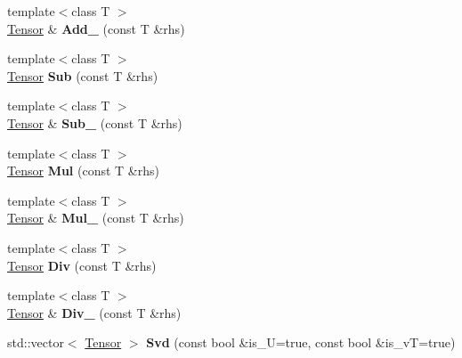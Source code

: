 \begin{DoxyCompactItemize}
{\footnotesize template$<$class T $>$ }\\\hyperlink{classcytnx_1_1Tensor}{Tensor} \& {\bfseries Add\+\_\+} (const T \&rhs)
\item 
\mbox{\label{classcytnx_1_1Tensor_a4648eef7874bad42d6d7b15fb1598644}} 
{\footnotesize template$<$class T $>$ }\\\hyperlink{classcytnx_1_1Tensor}{Tensor} {\bfseries Sub} (const T \&rhs)
\item 
\mbox{\label{classcytnx_1_1Tensor_a3482ddb0ebd4ae6585dcea7c96702e0c}} 
{\footnotesize template$<$class T $>$ }\\\hyperlink{classcytnx_1_1Tensor}{Tensor} \& {\bfseries Sub\+\_\+} (const T \&rhs)
\item 
\mbox{\label{classcytnx_1_1Tensor_a443885c8f02ab5352d81255e4650cf32}} 
{\footnotesize template$<$class T $>$ }\\\hyperlink{classcytnx_1_1Tensor}{Tensor} {\bfseries Mul} (const T \&rhs)
\item 
\mbox{\label{classcytnx_1_1Tensor_a92461c94266f7185da6f8fd35d1ffee4}} 
{\footnotesize template$<$class T $>$ }\\\hyperlink{classcytnx_1_1Tensor}{Tensor} \& {\bfseries Mul\+\_\+} (const T \&rhs)
\item 
\mbox{\label{classcytnx_1_1Tensor_add04fc004ccab102743f3e392f6bb482}} 
{\footnotesize template$<$class T $>$ }\\\hyperlink{classcytnx_1_1Tensor}{Tensor} {\bfseries Div} (const T \&rhs)
\item 
\mbox{\label{classcytnx_1_1Tensor_a030748d3e2003f655b1cf73fe0d55a63}} 
{\footnotesize template$<$class T $>$ }\\\hyperlink{classcytnx_1_1Tensor}{Tensor} \& {\bfseries Div\+\_\+} (const T \&rhs)
\item 
\mbox{\label{classcytnx_1_1Tensor_a0dc4a19c04d3576c3364deb74251d855}} 
std\+::vector$<$ \hyperlink{classcytnx_1_1Tensor}{Tensor} $>$ {\bfseries Svd} (const bool \&is\+\_\+U=true, const bool \&is\+\_\+vT=true)
\item 

\end{DoxyCompactItemize}
